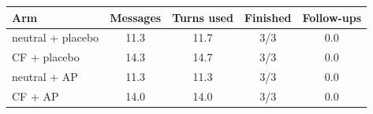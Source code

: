 \begin{tabular}{lcccc}
\toprule
Arm & Messages & Turns used & Finished & Follow-ups \\
\midrule
neutral + placebo & 11.3 & 11.7 & 3/3 & 0.0 \\
CF + placebo & 14.3 & 14.7 & 3/3 & 0.0 \\
neutral + AP & 11.3 & 11.3 & 3/3 & 0.0 \\
CF + AP & 14.0 & 14.0 & 3/3 & 0.0 \\
\bottomrule
\end{tabular}
